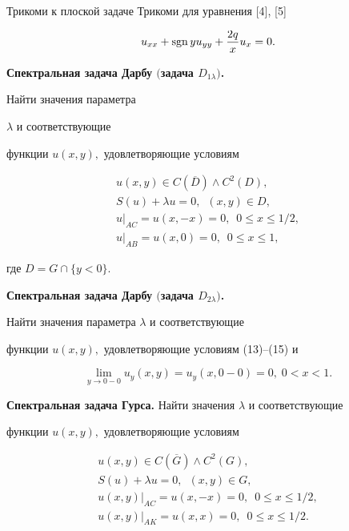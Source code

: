 Трикоми к плоской задаче Трикоми для уравнения [4], [5]


$$


u_{xx}+\sgn y u_{yy}+\frac{2q}{x}u_x=0.


$$





{\bf Спектральная задача Дарбу $($задача $D_{1\lambda})$.}


Найти значения параметра


$\lambda$ и соответствующие


функции $u(x,y),$ удовлетворяющие условиям


\begin{gather}


u(x,y)\in C(\overline D)\land C^2(D),\\


%


S(u)+\lambda u=0,\ \; (x,y) \in D,\\


%


u\big|_{AC}=u(x,-x)=0,\ \;0\le x\le 1/2,\\


%


u\big|_{AB}=u(x,0)=0,\ \;0\le x\le 1,


\end{gather}


где $D=G\cap \{y<0\}.$


\medskip





{\bf Спектральная задача Дарбу $($задача $D_{2\lambda})$.}


Найти значения параметра $\lambda$ и соответствующие


функции $u(x,y),$ удовлетворяющие условиям (13)--(15) и


\begin{equation}


\lim\limits_{y\to 0-0}u_y(x,y)=u_y(x,0-0)=0,\;0<x<1.\tag{$16^*$}


\end{equation}





{\bf Спектральная задача Гурса.} Найти значения $\lambda$ и соответствующие


функции $u(x,y),$ удовлетворяющие условиям


\begin{gather}


u(x,y)\in C(\overline G)\land C^2(G),\\


%


S(u)+\lambda u=0,\ \;(x,y)\in G,\\


%


u(x,y)\big|_{AC}=u(x,-x)=0,\ \;0\le x\le 1/2,\\


%


u(x,y)\big |_{AK}=u(x,x)=0,\ \;0\le x\le 1/2.


\end{gather}





